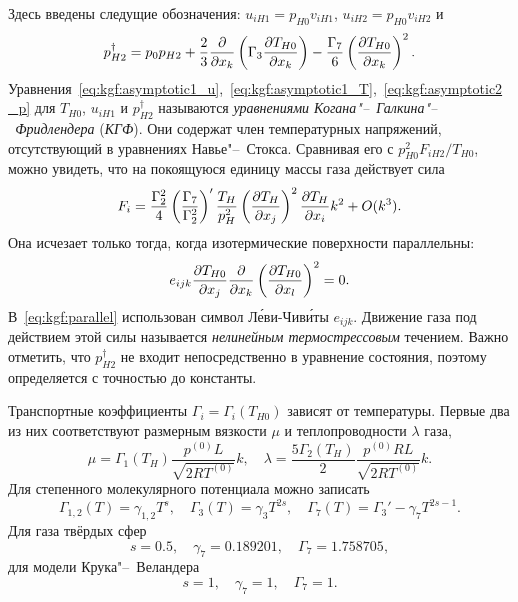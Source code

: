 Здесь введены следущие обозначения: \(u_{iH1} = p_{H0}v_{iH1}\), \(u_{iH2} = p_{H0}v_{iH2}\) и
\begin{equation}\label{eq:kgf:dag_pressure}
    p_{H2}^\dag = p_0 p_{H2}
        + \frac23\pder{x_k}\left(\Gamma_3\pder[T_{H0}]{x_k}\right)
        - \frac{\Gamma_7}{6}\left(\pder[T_{H0}]{x_k}\right)^2.
\end{equation}
Уравнения~\eqref{eq:kgf:asymptotic1_u},~\eqref{eq:kgf:asymptotic1_T},~\eqref{eq:kgf:asymptotic2_p}
для \(T_{H0}\), \(u_{iH1}\) и \(p_{H2}^\dag\) называются \emph{уравнениями Когана"--~Галкина"--~Фридлендера} (\emph{КГФ}).
Они содержат член температурных напряжений, отсутствующий в уравнениях Навье"--~Стокса.
Сравнивая его с \(p_{H0}^2F_{iH2}/T_{H0}\), можно увидеть, что на покоящуюся единицу массы газа действует сила
\begin{equation}\label{eq:kgf:gamma7_force}
    F_i = \frac{\Gamma_2^2}4\left(\frac{\Gamma_7}{\Gamma_2^2}\right)'\frac{T_H}{p_H^2}
        \left(\pder[T_H]{x_j}\right)^2 \pder[T_H]{x_i} k^2 + \OO{k^3}.
\end{equation}
Она исчезает только тогда, когда изотермические поверхности параллельны:
\begin{equation}\label{eq:kgf:parallel}
    e_{ijk}\pder[T_{H0}]{x_j}\pder{x_k}\left(\pder[T_{H0}]{x_l}\right)^2 = 0.
\end{equation}
В~\eqref{eq:kgf:parallel} использован символ Л\'{е}ви-Чив\'{и}ты \(e_{ijk}\).
Движение газа под действием этой силы называется \emph{нелинейным термострессовым} течением.
Важно отметить, что \(p_{H2}^\dag\) не входит непосредственно в уравнение состояния,
поэтому определяется с точностью до константы.

Транспортные коэффициенты \(\Gamma_i=\Gamma_i(T_{H0})\) зависят от температуры.
Первые два из них соответствуют размерным вязкости \(\mu\) и теплопроводности \(\lambda\) газа,
\begin{equation}\label{eq:mu_lambda}
    \mu = \Gamma_1(T_H) \frac{p^{(0)}L}{\sqrt{2RT^{(0)}}} k, \quad
    \lambda = \frac{5\Gamma_2(T_H)}{2} \frac{p^{(0)}RL}{\sqrt{2RT^{(0)}}} k.
\end{equation}
Для степенного молекулярного потенциала можно записать
\begin{equation}\label{eq:kgf:Gammas}
    \Gamma_{1,2}(T) = \gamma_{1,2}T^s, \quad \Gamma_3(T) = \gamma_3T^{2s},
        \quad \Gamma_7(T) = \Gamma_3' - \gamma_7T^{2s-1}.
\end{equation}
Для газа твёрдых сфер
\begin{equation}\label{eq:kgf:gammas}
    s=0.5, \quad \gamma_7 = 0.189201, \quad \Gamma_7 = 1.758705,
\end{equation}
для модели Крука"--~Веландера
\begin{equation}\label{eq:kgf:gammas_bgk}
    s=1, \quad \gamma_7 = 1, \quad \Gamma_7 = 1.
\end{equation}

